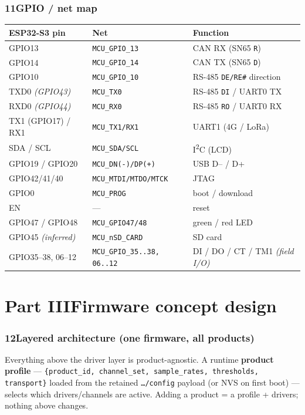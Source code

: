 \section*{11\quad GPIO / net map}
\begin{center}
\renewcommand{\arraystretch}{1.18}\small
\begin{tabularx}{\textwidth}{@{}l l X@{}}
\toprule
\textbf{ESP32-S3 pin} & \textbf{Net} & \textbf{Function} \\
\midrule
GPIO13 & \texttt{MCU\_GPIO\_13} & CAN RX (SN65 \texttt{R}) \\
GPIO14 & \texttt{MCU\_GPIO\_14} & CAN TX (SN65 \texttt{D}) \\
GPIO10 & \texttt{MCU\_GPIO\_10} & RS-485 \texttt{DE/RE\#} direction \\
TXD0 \emph{(GPIO43)} & \texttt{MCU\_TX0} & RS-485 \texttt{DI} / UART0 TX \\
RXD0 \emph{(GPIO44)} & \texttt{MCU\_RX0} & RS-485 \texttt{RO} / UART0 RX \\
TX1 (GPIO17) / RX1 & \texttt{MCU\_TX1/RX1} & UART1 (4G / LoRa) \\
SDA / SCL & \texttt{MCU\_SDA/SCL} & I\textsuperscript{2}C (LCD) \\
GPIO19 / GPIO20 & \texttt{MCU\_DN(-)/DP(+)} & USB D-- / D+ \\
GPIO42/41/40 & \texttt{MCU\_MTDI/MTDO/MTCK} & JTAG \\
GPIO0 & \texttt{MCU\_PROG} & boot / download \\
EN & --- & reset \\
GPIO47 / GPIO48 & \texttt{MCU\_GPIO47/48} & green / red LED \\
GPIO45 \emph{(inferred)} & \texttt{MCU\_nSD\_CARD} & SD card \\
GPIO35--38, 06--12 & \texttt{MCU\_GPIO\_35..38, 06..12} & DI / DO / CT / TM1 \emph{(field I/O)} \\
\bottomrule
\end{tabularx}
\end{center}

\part*{Part III\quad Firmware concept design}

\section*{12\quad Layered architecture (one firmware, all products)}
Everything above the driver layer is product-agnostic. A runtime \textbf{product profile} —
\texttt{\{product\_id, channel\_set, sample\_rates, thresholds, transport\}} loaded from the
retained \texttt{\dots /config} payload (or NVS on first boot) — selects which drivers/channels are
active. Adding a product = a profile + drivers; nothing above changes.

